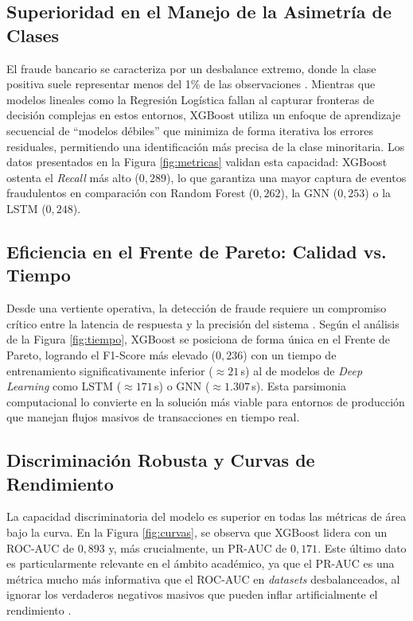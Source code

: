 \documentclass[12pt,a4paper]{report}
\begin{document}
\subsection{Superioridad en el Manejo de la Asimetría de Clases}
El fraude bancario se caracteriza por un desbalance extremo, donde la clase positiva suele representar menos del 1\% de las observaciones \cite{das2023, yang2026}. Mientras que modelos lineales como la Regresión Logística fallan al capturar fronteras de decisión complejas en estos entornos, XGBoost utiliza un enfoque de aprendizaje secuencial de ``modelos débiles'' que minimiza de forma iterativa los errores residuales, permitiendo una identificación más precisa de la clase minoritaria. Los datos presentados en la Figura \ref{fig:metricas} validan esta capacidad: XGBoost ostenta el \textit{Recall} más alto ($0{,}289$), lo que garantiza una mayor captura de eventos fraudulentos en comparación con Random Forest ($0{,}262$), la GNN ($0{,}253$) o la LSTM ($0{,}248$).

\subsection{Eficiencia en el Frente de Pareto: Calidad vs. Tiempo}
Desde una vertiente operativa, la detección de fraude requiere un compromiso crítico entre la latencia de respuesta y la precisión del sistema \cite{martini2025}. Según el análisis de la Figura \ref{fig:tiempo}, XGBoost se posiciona de forma única en el Frente de Pareto, logrando el F1-Score más elevado ($0{,}236$) con un tiempo de entrenamiento significativamente inferior ($\approx 21$\,s) al de modelos de \textit{Deep Learning} como LSTM ($\approx 171$\,s) o GNN ($\approx 1.307$\,s). Esta parsimonia computacional lo convierte en la solución más viable para entornos de producción que manejan flujos masivos de transacciones en tiempo real.

\subsection{Discriminación Robusta y Curvas de Rendimiento}
La capacidad discriminatoria del modelo es superior en todas las métricas de área bajo la curva. En la Figura \ref{fig:curvas}, se observa que XGBoost lidera con un ROC-AUC de $0{,}893$ y, más crucialmente, un PR-AUC de $0{,}171$. Este último dato es particularmente relevante en el ámbito académico, ya que el PR-AUC es una métrica mucho más informativa que el ROC-AUC en \textit{datasets} desbalanceados, al ignorar los verdaderos negativos masivos que pueden inflar artificialmente el rendimiento \cite{saito2015, chen2025}.
\end{document}
